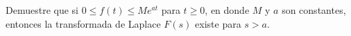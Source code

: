 \item Demuestre que si $0 \le f(t) \le M e^{at}$ para $t \ge 0$, en donde $M$ y $a$ son constantes, entonces la transformada de Laplace $F(s)$ existe para $s > a$.
